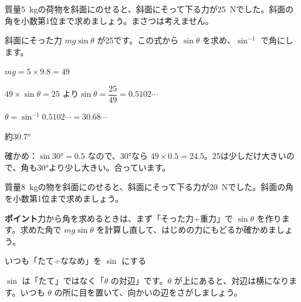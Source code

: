 \begin{reidai}[力から斜面の角を求める]
質量\qty{5}{kg}の荷物を斜面にのせると、斜面にそって下る力が\qty{25}{N}でした。斜面の角を小数第1位まで求めましょう。まさつは考えません。\par
\kangaekata 斜面にそった力 $mg\sin\theta$ が25です。この式から $\sin\theta$ を求め、$\sin^{-1}$ で角にします。\par
\shiki $mg=5\times9.8=49$\par
\hspace*{2.6\zw}$49\times\sin\theta=25$ より\quad $\sin\theta=\dfrac{25}{49}=0.5102\cdots$\par
\hspace*{2.6\zw}$\theta=\sin^{-1}0.5102\cdots=30.68\cdots$\par
\kotae 約\ang{30.7}
\end{reidai}
確かめ：$\sin\ang{30}=0.5$ なので、\ang{30}なら $49\times0.5=24.5$。25は少しだけ大きいので、角も\ang{30}より少し大きい。合っています。

\begin{jibun}
質量\qty{8}{kg}の物を斜面にのせると、斜面にそって下る力が\qty{20}{N}でした。斜面の角を小数第1位まで求めましょう。
\end{jibun}
\textbf{ポイント}\quad 力から角を求めるときは、まず「そった力÷重力」で $\sin\theta$ を作ります。求めた角で $mg\sin\theta$ を計算し直して、はじめの力にもどるか確かめましょう。


\begin{tsumazuki}{いつも「たて÷ななめ」を $\sin$ にする}
\noindent\begin{minipage}[c]{0.66\linewidth}
$\sin$ は「たて」ではなく「$\theta$ の対辺」です。$\theta$ が上にあると、対辺は横になります。いつも $\theta$ の所に目を置いて、向かいの辺をさがしましょう。
\end{minipage}\hfill
\begin{minipage}[c]{0.3\linewidth}\centering
{}
\end{minipage}
\end{tsumazuki}

